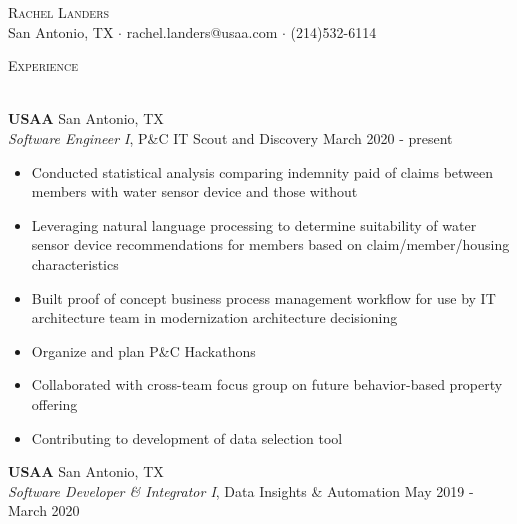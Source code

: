 \documentclass[a4paper]{article}
\newcommand{\lineunder} {
    \vspace*{-8pt} \\
    \hspace*{-18pt} \hrulefill \\
}
\newcommand{\header} [1] {
    {\hspace*{-18pt}\vspace*{6pt} \textsc{#1}}
    \vspace*{-6pt} \lineunder
}
\begin{document}
\vspace*{-10pt}

    

\vspace*{-40pt}
\begin{center}
	{\Huge \scshape {Rachel Landers}}\\
	San Antonio, TX $\cdot$ rachel.landers@usaa.com $\cdot$ (214)532-6114\\
\end{center}

\header{Experience}
\vspace{1mm}

\textbf{USAA} \hfill San Antonio, TX\\
\textit{Software Engineer I}, P\&C IT Scout and Discovery \hfill March 2020 - present\\
\vspace{-2mm}
\begin{itemize} \itemsep .5pt
	\item Conducted statistical analysis comparing indemnity paid of claims between members with water sensor device and those without
	\item Leveraging natural language processing to determine suitability of water sensor device recommendations for members based on claim/member/housing characteristics
	\item Built proof of concept business process management workflow for use by IT architecture team in modernization architecture decisioning
	\item Organize and plan P\&C Hackathons
	\item Collaborated with cross-team focus group on future behavior-based property offering
	\item Contributing to development of data selection tool
\end{itemize}
\textbf{USAA} \hfill San Antonio, TX\\
\textit{Software Developer \& Integrator I}, Data Insights \& Automation \hfill May 2019 - March 2020 \\
\vspace{-2mm}
\end{document}
